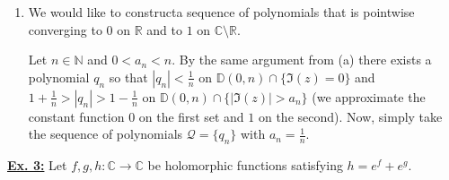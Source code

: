 \documentclass[a4paper, 12pt]{article} %
\newcommand{\D}{\mathbb{D}}
\newcommand{\N}{\mathbb{N}}
\newcommand{\R}{\mathbb{R}}
\newcommand{\C}{\mathbb{C}}
\newcommand{\closure}[1]{\overline{#1}}
\begin{document}
\begin{enumerate}[label=(\alph*)]
	\item We would like to constructa sequence of polynomials that is pointwise converging to $0$ on $\R$ and to $1$ on $\C \setminus \R$.
	
	Let $n \in \N$ and $0 < a_n < n$. By the same argument from (a) there exists a polynomial $q_n$ so that $|q_n| < \frac{1}{n}$ on $\D(0, n)\cap\lbrace\Im(z) = 0\rbrace$ and $1 + \frac{1}{n} > |q_n| > 1 - \frac{1}{n}$ on $\D(0, n)\cap\lbrace|\Im(z)| > a_n \rbrace$ (we approximate the constant function $0$ on the first set and $1$ on the second).
	Now, simply take the sequence of polynomials $\mathcal{Q} = \lbrace q_n\rbrace$ with $a_n = \frac{1}{n}$.
\end{enumerate}

\underline{\textbf{Ex. 3:}}
Let $f, g, h \colon \C \to \C$ be holomorphic functions satisfying $h = e^f + e^g$.
\end{document}
